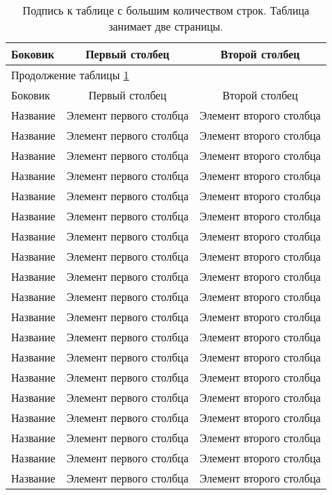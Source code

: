 \begin{longtable}{|l|c|c|}
\caption{Подпись к таблице с большим количеством строк. Таблица занимает две страницы.}
\label{tab:long}
 \\ \hline
Боковик & Первый столбец & Второй столбец \\ \hline
        \endfirsthead
\multicolumn{3}{l}{Продолжение таблицы \ref{tab:long}}
\\ \hline
Боковик & Первый столбец & Второй столбец \\ \hline
        \endhead
        \endfoot
    \hline  \endlastfoot

Название & Элемент первого столбца & Элемент второго столбца \\
Название & Элемент первого столбца & Элемент второго столбца \\
Название & Элемент первого столбца & Элемент второго столбца \\
Название & Элемент первого столбца & Элемент второго столбца \\
Название & Элемент первого столбца & Элемент второго столбца \\
Название & Элемент первого столбца & Элемент второго столбца \\
Название & Элемент первого столбца & Элемент второго столбца \\
Название & Элемент первого столбца & Элемент второго столбца \\
Название & Элемент первого столбца & Элемент второго столбца \\
Название & Элемент первого столбца & Элемент второго столбца \\
Название & Элемент первого столбца & Элемент второго столбца \\
Название & Элемент первого столбца & Элемент второго столбца \\
Название & Элемент первого столбца & Элемент второго столбца \\
Название & Элемент первого столбца & Элемент второго столбца \\
Название & Элемент первого столбца & Элемент второго столбца \\
Название & Элемент первого столбца & Элемент второго столбца \\
Название & Элемент первого столбца & Элемент второго столбца \\
Название & Элемент первого столбца & Элемент второго столбца \\
Название & Элемент первого столбца & Элемент второго столбца \\

\end{longtable}
